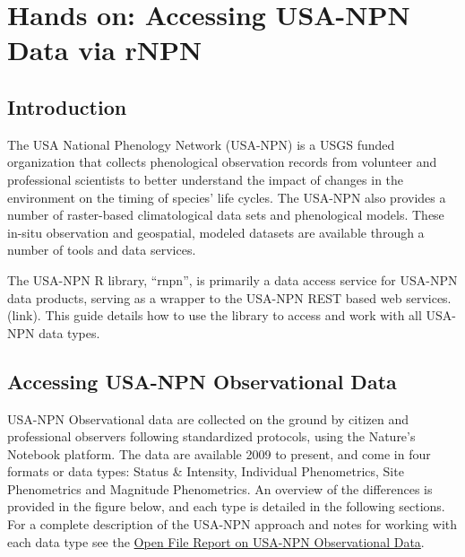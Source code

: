 \documentclass[]{book}
\begin{document}
\hypertarget{hands-on-accessing-usa-npn-data-via-rnpn}{%
\section{Hands on: Accessing USA-NPN Data via rNPN}\label{hands-on-accessing-usa-npn-data-via-rnpn}}

\hypertarget{introduction}{%
\subsection{Introduction}\label{introduction}}

The USA National Phenology Network (USA-NPN) is a USGS funded organization that collects phenological observation records from volunteer and professional scientists to better understand the impact of changes in the environment on the timing of species' life cycles. The USA-NPN also provides a number of raster-based climatological data sets and phenological models. These in-situ observation and geospatial, modeled datasets are available through a number of tools and data services.

The USA-NPN R library, ``rnpn'', is primarily a data access service for USA-NPN data products, serving as a wrapper to the USA-NPN REST based web services. (link). This guide details how to use the library to access and work with all USA-NPN data types.

\hypertarget{accessing-usa-npn-observational-data}{%
\subsection{Accessing USA-NPN Observational Data}\label{accessing-usa-npn-observational-data}}

USA-NPN Observational data are collected on the ground by citizen and professional observers following standardized protocols, using the Nature's Notebook platform. The data are available 2009 to present, and come in four formats or data types: Status \& Intensity, Individual Phenometrics, Site Phenometrics and Magnitude Phenometrics. An overview of the differences is provided in the figure below, and each type is detailed in the following sections. For a complete description of the USA-NPN approach and notes for working with each data type see the \href{https://pubs.usgs.gov/of/2018/1060/ofr20181060.pdf}{Open File Report on USA-NPN Observational Data}.
\end{document}

